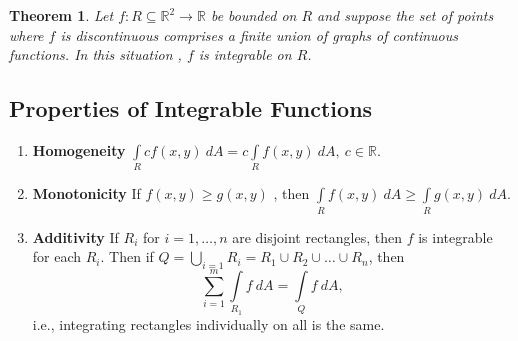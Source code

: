 \documentclass[
	12pt,
	]{article}
\newcommand{\R}{\mathbb{R}}
\theoremstyle{custom}
\newtheorem{theorem}{Theorem}[section]
\theoremstyle{custom}
\theoremstyle{custom}
\theoremstyle{custom}
\theoremstyle{custom}
\theoremstyle{definition}
\theoremstyle{example}
\theoremstyle{note}
\theoremstyle{remark}
\theoremstyle{example}
\newcounter{theo}[section]\setcounter{theo}{0}
\numberwithin{equation}{subsection}
\begin{document}
	   		 \begin{theorem}
	   		 	Let $f : R \subseteq \R^{2} \to \R $ be bounded on $R$ and suppose the set of points where $f$ is discontinuous comprises a finite union of graphs of continuous functions. In this situation , $f$ is integrable on $R$.
	   		 \end{theorem}
	   		 
	   		 \subsection{Properties of Integrable Functions}
	   		 \begin{enumerate}[label=(\roman*)]
	   		 	\item \textbf{Homogeneity} $\int\limits_R c f(x,y) \ dA = c \int\limits_R f(x,y) \ dA , \ c \in \R.$ 
	   		 	\item \textbf{Monotonicity } If $f(x,y) \ge g(x,y)$ , then $\int\limits_R f(x,y) \ dA \ge \int\limits_R g(x,y) \ dA.$ 
	   		 	\item \textbf{Additivity} If $R_{i} $ for $i =1 , \dots, n$ are disjoint rectangles, then $f$ is integrable for each $R_{i}$. Then if $Q= \bigcup\limits_{i=1} R_{i} = R_{1} \cup R_{2} \cup \dots \cup R_{n}$, then 
	   		 	\begin{equation} 
	   		 	\sum_{i=1}^{m} \int\limits_{R_{1}} f \ dA = \int\limits_Q f \ dA, 
	   		 	\end{equation}
	   		 	i.e., integrating rectangles individually on all is the same.
	   		 \end{enumerate}
	   		 
\end{document}
